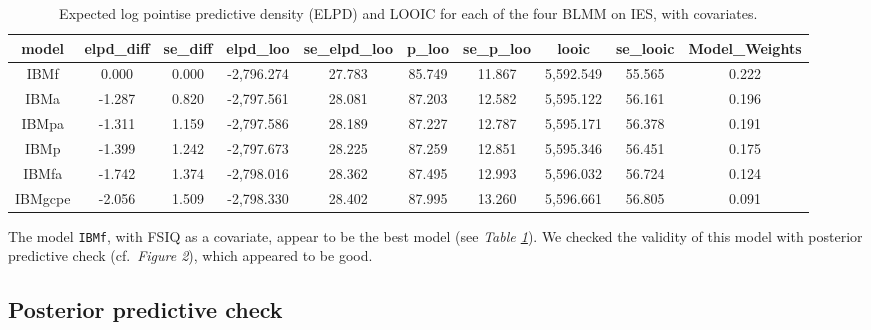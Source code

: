 \documentclass[
  11pt,
  english,
  ,doc,floatsintext]{apa6}
\begin{document}
\begin{table}[htb]

\begin{center}
\begin{threeparttable}

\caption{\label{tab:modelCompIES2}Expected log pointise predictive density (ELPD) and LOOIC for each of the four BLMM on IES, with covariates.}

\tiny{

\begin{tabular}{cccccccccc}
\toprule
model & \multicolumn{1}{c}{elpd\_diff} & \multicolumn{1}{c}{se\_diff} & \multicolumn{1}{c}{elpd\_loo} & \multicolumn{1}{c}{se\_elpd\_loo} & \multicolumn{1}{c}{p\_loo} & \multicolumn{1}{c}{se\_p\_loo} & \multicolumn{1}{c}{looic} & \multicolumn{1}{c}{se\_looic} & \multicolumn{1}{c}{Model\_Weights}\\
\midrule
IBMf & 0.000 & 0.000 & -2,796.274 & 27.783 & 85.749 & 11.867 & 5,592.549 & 55.565 & 0.222\\
IBMa & -1.287 & 0.820 & -2,797.561 & 28.081 & 87.203 & 12.582 & 5,595.122 & 56.161 & 0.196\\
IBMpa & -1.311 & 1.159 & -2,797.586 & 28.189 & 87.227 & 12.787 & 5,595.171 & 56.378 & 0.191\\
IBMp & -1.399 & 1.242 & -2,797.673 & 28.225 & 87.259 & 12.851 & 5,595.346 & 56.451 & 0.175\\
IBMfa & -1.742 & 1.374 & -2,798.016 & 28.362 & 87.495 & 12.993 & 5,596.032 & 56.724 & 0.124\\
IBMgcpe & -2.056 & 1.509 & -2,798.330 & 28.402 & 87.995 & 13.260 & 5,596.661 & 56.805 & 0.091\\
\bottomrule
\end{tabular}

}

\end{threeparttable}
\end{center}

\end{table}

The model \texttt{IBMf}, with FSIQ as a covariate, appear to be the best model (see \emph{Table \ref{tab:modelCompIES2}}). We checked the validity of this model with posterior predictive check (cf.~\emph{Figure 2}), which appeared to be good.

\hypertarget{posterior-predictive-check-1}{%
\subsection{Posterior predictive check}\label{posterior-predictive-check-1}}
\end{document}
